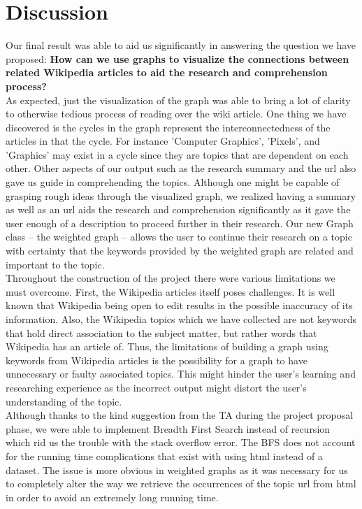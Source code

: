 \documentclass[fontsize=11pt]{article}
\begin{document}
\section*{Discussion}

\qquad Our final result was able to aid us significantly in answering the question we have proposed: \textbf{How can we use graphs to visualize the connections between related Wikipedia articles to aid the research and comprehension process?} \\

As expected, just the visualization of the graph was able to bring a lot of clarity to otherwise tedious process of reading over the wiki article. One thing we have discovered is the cycles in the graph represent the interconnectedness of the articles in that the cycle. For instance 'Computer Graphics', 'Pixels', and 'Graphics' may exist in a cycle since they are topics that are dependent on each other. Other aspects of our output such as the research summary and the url also gave us guide in comprehending  the topics. Although one might be capable of grasping rough ideas through the visualized graph, we realized having a summary as well as an url aids the research and comprehension significantly as it gave the user enough of a description to proceed further in their research. Our new Graph class – the weighted graph – allows the user to continue their research on a topic with certainty that the keywords provided by the weighted graph are related and important to the topic. \\

Throughout the construction of the project there were various limitations we must overcome. First, the Wikipedia articles itself poses challenges. It is well known that Wikipedia being open to edit results in the possible inaccuracy of its information. Also, the Wikipedia topics which we have collected are not keywords that hold direct association to the subject matter, but rather words that Wikipedia has an article of. Thus, the limitations of building a graph using keywords from Wikipedia articles is the possibility for a graph to have unnecessary or faulty associated topics. This might hinder the user's learning and researching experience as the incorrect output might distort the user's understanding of the topic. \\

Although thanks to the kind suggestion from the TA during the project proposal phase, we were able to implement Breadth First Search instead of recursion which rid us the trouble with the stack overflow error. The BFS does not account for the running time complications that exist with using html instead of a dataset. The issue is more obvious in weighted graphs as it was necessary for us to completely alter the way we retrieve the occurrences of the topic url from html in order to avoid an extremely long running time. \\
\end{document}
